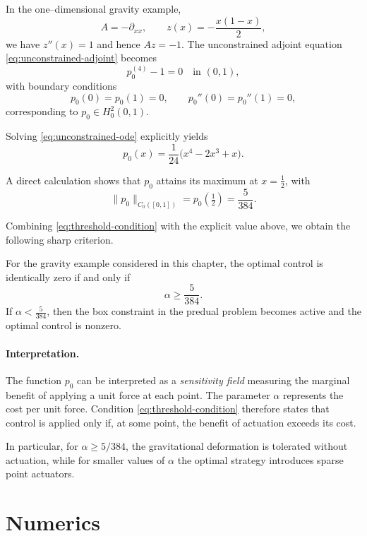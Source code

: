 \documentclass[11pt,a4paper]{article}
\begin{document}
In the one--dimensional gravity example,
\[
A = -\partial_{xx},
\qquad
z(x) = -\frac{x(1-x)}{2},
\]
we have $z''(x)=1$ and hence $A z = -1$.
The unconstrained adjoint equation \eqref{eq:unconstrained-adjoint} becomes
\begin{equation}
p_0^{(4)} - 1 = 0
\quad \text{in } (0,1),
\label{eq:unconstrained-ode}
\end{equation}
with boundary conditions
\[
p_0(0)=p_0(1)=0,
\qquad
p_0''(0)=p_0''(1)=0,
\]
corresponding to $p_0\in H_0^2(0,1)$.

Solving \eqref{eq:unconstrained-ode} explicitly yields
\[
p_0(x)
=
\frac{1}{24}\bigl(x^4 - 2x^3 + x\bigr).
\]

A direct calculation shows that $p_0$ attains its maximum at $x=\tfrac12$, with
\[
\|p_0\|_{C_0([0,1])}
=
p_0\!\left(\tfrac12\right)
=
\frac{5}{384}.
\]

Combining \eqref{eq:threshold-condition} with the explicit value above, we obtain
the following sharp criterion.

\begin{proposition}
\label{prop:no-control-threshold}
For the gravity example considered in this chapter, the optimal control is
identically zero if and only if
\[
\alpha \ge \frac{5}{384}.
\]
If $\alpha < \frac{5}{384}$, then the box constraint in the predual problem
becomes active and the optimal control is nonzero.
\end{proposition}

\paragraph{Interpretation.}
The function $p_0$ can be interpreted as a \emph{sensitivity field} measuring the
marginal benefit of applying a unit force at each point.
The parameter $\alpha$ represents the cost per unit force.
Condition \eqref{eq:threshold-condition} therefore states that control is applied
only if, at some point, the benefit of actuation exceeds its cost.

In particular, for $\alpha \ge 5/384$, the gravitational deformation is tolerated
without actuation, while for smaller values of $\alpha$ the optimal strategy
introduces sparse point actuators.




\section{Numerics}
\label{sec:numerics}
\end{document}
